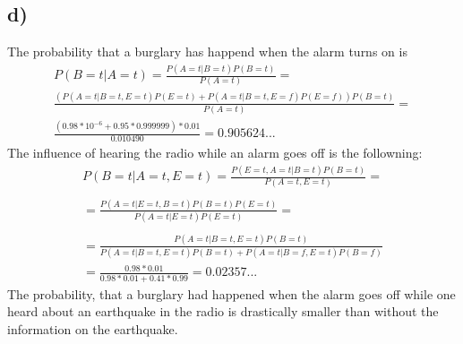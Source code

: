 \documentclass[11pt,a4paper]{article}
\begin{document}
\subsection*{d)}
The probability that a burglary has happend when the alarm turns on is
\begin{equation*}
\begin{split}
  P(B=t|A=t) = \frac{P(A=t|B=t)P(B=t)}{P(A=t)}=\\
  \frac{(P(A=t|B=t,E=t)P(E=t)+P(A=t|B=t,E=f)P(E=f))P(B=t)}{P(A=t)}=\\
  \frac{(0.98*10^{-6}+0.95*0.999999)*0.01}{0.010490}=0.905624...
  \end{split}
\end{equation*}
The influence of hearing the radio while an alarm goes off is the followning:
\begin{equation*}
  \begin{split}
  P(B=t|A=t,E=t)  = \frac{P(E=t, A=t | B=t)P(B=t)}{P(A=t,E=t)}= \\
  \\
  =  \frac{P(A=t |E=t, B=t)P(B=t)P(E=t)}{P(A=t|E=t)P(E=t)}= \\
  \\
  =  \frac{P(A=t| B=t, E=t)P(B=t)}{P(A=t|B=t,E=t)P(B=t)+P(A=t|B=f,E=t)P(B=f)} \\
  = \frac{0.98*0.01}{0.98*0.01+0.41*0.99}=0.02357...
  \end{split}
\end{equation*}
The probability, that a burglary had happened when the alarm goes off while one heard about an earthquake in the radio is drastically smaller than without the information on the earthquake.
\end{document}
